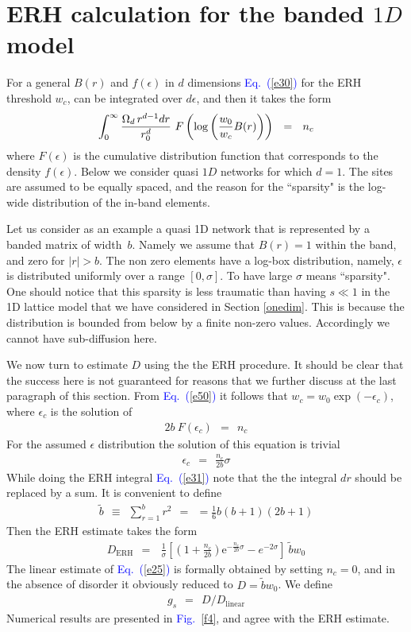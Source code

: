 \documentclass[onecolumn,fleqn,12pt,openany,draft]{book}
\newcommand{\eexp}{\mbox{e}^}
\newcommand{\mylabel}[1]{\label{#1}}
\newcommand{\beq}{\begin{eqnarray}}
\newcommand{\eeq}{\end{eqnarray}}
\newcommand{\be}[1]{\begin{eqnarray}\ifthenelse{#1=-1}
{\nonumber}{\ifthenelse{#1=0}{}{\mylabel{e#1}}}}
\newcommand{\Eq}[1]{\textcolor{blue}{Eq.\!\!~(\ref{#1})}}
\newcommand{\Fig}[1]{\textcolor{blue}{Fig.}\!\!~\ref{#1}}
\begin{document}
\section{ERH calculation for the banded $1D$ model}

For a general $B(r)$ and $f(\epsilon)$ in $d$ dimensions \Eq{e30} 
for the ERH threshold $w_c$, can be integrated over $d\epsilon$, 
and then it takes the form 
%
\be{50}
\int_0^{\infty}  
\frac{\Omega_d \, r^{d-1}dr}{r_0^{d}} 
\ F\left(\log\left(\frac{w_0}{w_c}B(r)\right)\right) 
\ \ = \ \ n_c
\eeq 
%
where $F(\epsilon)$ is the cumulative distribution function 
that corresponds to the density $f(\epsilon)$.
Below we consider quasi $1D$ networks for which ${d=1}$.
The sites are assumed to be equally spaced, 
and the reason for the ``sparsity" is the log-wide 
distribution of the in-band elements. 

Let us consider as an example a quasi 1D network 
that is represented by a banded matrix of width~$b$.  
Namely we assume that ${B(r)=1}$ within the band, 
and zero for ${|r|>b}$. 
The non zero elements have a log-box distribution, 
namely, $\epsilon$ is distributed uniformly over a range $[0,\sigma]$. 
To have large $\sigma$ means ``sparsity".
One should notice that this sparsity is less 
traumatic than having $s\ll1$ in the 1D lattice model 
that we have considered in Section \ref{onedim}.
This is because the distribution is bounded 
from below by a finite non-zero values. 
Accordingly we cannot have sub-diffusion here.  

We now turn to estimate $D$ using the 
the ERH procedure. It should be clear that the 
success here is not guaranteed for reasons 
that we further discuss at the last paragraph
of this section.
%  
From \Eq{e50} it follows that ${w_c=w_0\exp(-\epsilon_c)}$, 
where $\epsilon_c$ is the solution of 
%
\beq
2b \ F\left( \epsilon_c \right) \ \ = \ \ n_c
\eeq
%
For the assumed $\epsilon$ distribution the 
solution of this equation is trivial 
%
\beq
\epsilon_c \ \ = \ \ \frac{n_c}{2b}\sigma
\eeq
%
While doing the ERH integral \Eq{e31} note that the 
the integral $dr$ should be replaced by a sum.
It is convenient to define
%
\beq
\tilde{b} \ \ \equiv \ \ \sum_{r=1}^b r^2 \ \ = \ \ = \frac{1}{6}b(b+1)(2b+1)
\eeq
%
Then the ERH estimate takes the form
%
\beq
D_{\text{ERH}} \ \ = \ \ 
\ \frac{1}{\sigma}\left[ 
\left(1+\frac{n_c}{2b}\right)\eexp{-\frac{n_c}{2b}\sigma} - e^{-2\sigma}
\right] \ \tilde{b} w_0
\eeq 
% 
The linear estimate of \Eq{e25} is formally obtained 
by setting ${n_c=0}$, and in the absence 
of disorder it obviously reduced to $D=\tilde{b} w_0$. 
We define 
%
\beq
g_s \ \ = \ \ D/D_{\text{linear}}
\eeq
%
Numerical results are presented in \Fig{f4}, 
and agree with the ERH estimate.
\end{document}

